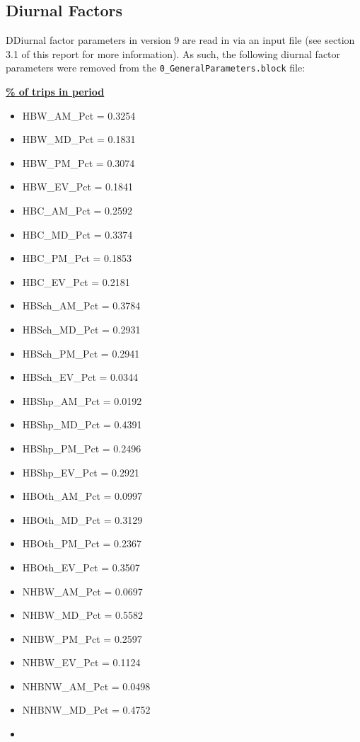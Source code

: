 \documentclass[
  letterpaper,
  DIV=11,
  numbers=noendperiod,
  titlepage=false]{scrreprt}
\providecommand{\tightlist}{%
  \setlength{\itemsep}{0pt}\setlength{\parskip}{0pt}}\usepackage{longtable,booktabs,array}
\begin{document}
\hypertarget{diurnal-factors}{%
\subsection{Diurnal Factors}\label{diurnal-factors}}

DDiurnal factor parameters in version 9 are read in via an input file
(see section 3.1 of this report for more information). As such, the
following diurnal factor parameters were removed from the
\texttt{0\_GeneralParameters.block} file:

\textbf{\underline{\% of trips in period}}

\begin{itemize}
\tightlist
\item
  HBW\_AM\_Pct = 0.3254
\item
  HBW\_MD\_Pct = 0.1831
\item
  HBW\_PM\_Pct = 0.3074
\item
  HBW\_EV\_Pct = 0.1841
\item
  HBC\_AM\_Pct = 0.2592
\item
  HBC\_MD\_Pct = 0.3374
\item
  HBC\_PM\_Pct = 0.1853
\item
  HBC\_EV\_Pct = 0.2181
\item
  HBSch\_AM\_Pct = 0.3784
\item
  HBSch\_MD\_Pct = 0.2931
\item
  HBSch\_PM\_Pct = 0.2941
\item
  HBSch\_EV\_Pct = 0.0344
\item
  HBShp\_AM\_Pct = 0.0192
\item
  HBShp\_MD\_Pct = 0.4391
\item
  HBShp\_PM\_Pct = 0.2496
\item
  HBShp\_EV\_Pct = 0.2921
\item
  HBOth\_AM\_Pct = 0.0997
\item
  HBOth\_MD\_Pct = 0.3129
\item
  HBOth\_PM\_Pct = 0.2367
\item
  HBOth\_EV\_Pct = 0.3507
\item
  NHBW\_AM\_Pct = 0.0697
\item
  NHBW\_MD\_Pct = 0.5582
\item
  NHBW\_PM\_Pct = 0.2597
\item
  NHBW\_EV\_Pct = 0.1124
\item
  NHBNW\_AM\_Pct = 0.0498
\item
  NHBNW\_MD\_Pct = 0.4752
\item

\end{itemize}
\end{document}
